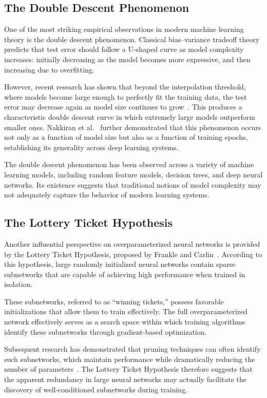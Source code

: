 \documentclass[conference]{IEEEtran}
\begin{document}
\subsection{The Double Descent Phenomenon}

One of the most striking empirical observations in modern machine learning theory is the double descent phenomenon. Classical bias--variance tradeoff theory predicts that test error should follow a U-shaped curve as model complexity increases: initially decreasing as the model becomes more expressive, and then increasing due to overfitting.

However, recent research has shown that beyond the interpolation threshold, where models become large enough to perfectly fit the training data, the test error may decrease again as model size continues to grow~\cite{belkin2019reconciling}. This produces a characteristic double descent curve in which extremely large models outperform smaller ones. Nakkiran et al.~\cite{nakkiran2020deep} further demonstrated that this phenomenon occurs not only as a function of model size but also as a function of training epochs, establishing its generality across deep learning systems.

The double descent phenomenon has been observed across a variety of machine learning models, including random feature models, decision trees, and deep neural networks. Its existence suggests that traditional notions of model complexity may not adequately capture the behavior of modern learning systems.

\subsection{The Lottery Ticket Hypothesis}

Another influential perspective on overparameterized neural networks is provided by the Lottery Ticket Hypothesis, proposed by Frankle and Carlin~\cite{frankle2019lottery}. According to this hypothesis, large randomly initialized neural networks contain sparse subnetworks that are capable of achieving high performance when trained in isolation.

These subnetworks, referred to as ``winning tickets,'' possess favorable initializations that allow them to train effectively. The full overparameterized network effectively serves as a search space within which training algorithms identify these subnetworks through gradient-based optimization.

Subsequent research has demonstrated that pruning techniques can often identify such subnetworks, which maintain performance while dramatically reducing the number of parameters~\cite{frankle2020linear}. The Lottery Ticket Hypothesis therefore suggests that the apparent redundancy in large neural networks may actually facilitate the discovery of well-conditioned subnetworks during training.
\end{document}
